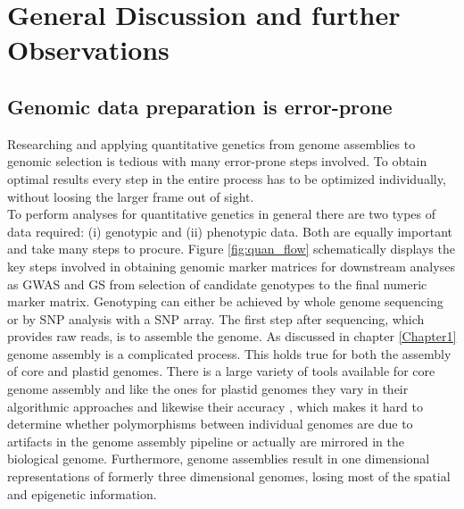 \chapter{General Discussion and further Observations} %
\label{Chapter6}
\section{Genomic data preparation is error-prone}

Researching and applying quantitative genetics from genome assemblies to genomic selection
is tedious with many error-prone steps involved. To obtain optimal results every step in
the entire process has to be optimized individually, without loosing the larger frame out
of sight. \\
To perform analyses for quantitative genetics in general there are two types of data
required: (i) genotypic and (ii) phenotypic data. Both are equally important and take many
steps to procure. Figure \ref{fig:quan_flow} schematically displays the key steps involved
in obtaining genomic marker matrices for downstream analyses as GWAS and GS from selection
of candidate genotypes to the final numeric marker matrix. Genotyping can either be
achieved by whole genome sequencing or by SNP analysis with a SNP array.
The first step after sequencing, which provides raw reads, is to assemble the genome. As
discussed in chapter \ref{Chapter1} genome assembly is a complicated process. This holds
true for both the assembly of core and plastid genomes. There is a large variety of tools
available for core genome assembly and like the ones for plastid genomes they vary in
their algorithmic approaches and likewise their accuracy \cite{zhang2011practical}, which
makes it hard to determine whether polymorphisms between individual genomes are due to
artifacts in the genome assembly pipeline or actually are mirrored in the biological
genome. Furthermore, genome assemblies result in one dimensional representations of formerly
three dimensional genomes, losing most of the spatial and epigenetic information.

